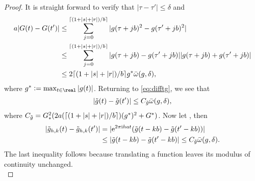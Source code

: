 \begin{proof}
   It is straight forward to verify that  $\vert \tau - \tau' \vert \le \delta$ and 
\begin{align}
a  \vert G(t) - G(t') \vert & \le  \sum_{j = 0}^{\lceil ( 1 + \vert s \vert  +\vert r \vert )/b \rceil} \vert g(\tau + j b)^2 - g(\tau' + j b)^2\vert\notag\\
  & \le \sum_{j = 0}^{\lceil (1 + \vert s \vert  +\vert r\vert )/b \rceil} \vert g(\tau + j b) - g(\tau' + j b) \vert \vert g(\tau + j b) + g(\tau' + j b)\vert\notag\\
  & \le 2 \lceil (1 + \vert s \vert  + \vert r \vert)/b\rceil g^*{\bar{\omega}}({g},\delta),
  \label{}
\end{align}
where $g^* := \max_{t \in \real} \vert g(t)\vert $.
Returning to \eqref{eq:difftg}, we see that
\begin{align}
  \vert \tilde{g}(t) - \tilde{g}(t')\vert \le C_{\tilde{g}} {\bar{\omega}}({g},\delta),\notag
  \label{}
\end{align}
where $C_{\tilde{g}} = G_*^2(2a (\lceil ( 1 + \vert s \vert  +\vert r\vert)/b\rceil)(g^*)^2 + G^*)$. Now let \hkints, then
\begin{align}
  \vert \tilde{g}_{h,k}(t) - \tilde{g}_{h,k}(t')\vert & = \vert \mathrm{e}^{2 \pi \mathrm{i} h a t} (\tilde{g}(t - kb) -\tilde{g}(t'-kb)) \vert\notag\\
  &\le \vert \tilde{g}(t - kb) -\tilde{g}(t'-kb) \vert \le C_{\tilde{g}} {\bar{\omega}}({g},\delta).
  \label{}
\end{align}
The last inequality follows because translating a function leaves its modulus of continuity unchanged.\\
\end{proof}





